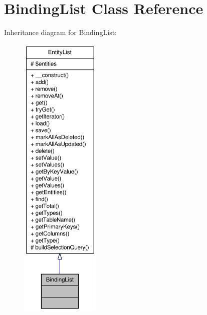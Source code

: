 \hypertarget{classBindingList}{
\section{BindingList Class Reference}
\label{classBindingList}
}


Inheritance diagram for BindingList:\nopagebreak
\begin{figure}[H]
\begin{center}
\leavevmode
\includegraphics[height=400pt]{classBindingList__inherit__graph}
\end{center}
\end{figure}


